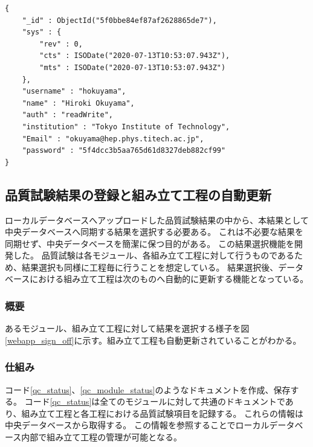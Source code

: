 \begin{lstlisting}[basicstyle=\scriptsize,caption=ウェブアプリケーションで扱うユーザ情報を持つドキュメントの例。リスト\ref{user_doc_1}で示したものとは別に、ウェブアプリケーション内でユーザ情報を扱うためにこのドキュメントを保持する必要がある。ウェブにおいてログインはこのドキュメントの存在確認をもってなされる。パスワードはhash化して保存している。,label=user_doc_2]
{
	"_id" : ObjectId("5f0bbe84ef87af2628865de7"),
	"sys" : {
		"rev" : 0,
		"cts" : ISODate("2020-07-13T10:53:07.943Z"),
		"mts" : ISODate("2020-07-13T10:53:07.943Z")
	},
	"username" : "hokuyama",
	"name" : "Hiroki Okuyama",
	"auth" : "readWrite",
	"institution" : "Tokyo Institute of Technology",
	"Email" : "okuyama@hep.phys.titech.ac.jp",
	"password" : "5f4dcc3b5aa765d61d8327deb882cf99"
}
\end{lstlisting}

\clearpage
\newpage
\subsection{品質試験結果の登録と組み立て工程の自動更新}
ローカルデータベースへアップロードした品質試験結果の中から、本結果として中央データベースへ同期する結果を選択する必要ある。
これは不必要な結果を同期せず、中央データベースを簡潔に保つ目的がある。
この結果選択機能を開発した。
品質試験は各モジュール、各組み立て工程に対して行うものであるため、結果選択も同様に工程毎に行うことを想定している。
結果選択後、データベースにおける組み立て工程は次のものへ自動的に更新する機能となっている。

\subsubsection{概要}
あるモジュール、組み立て工程に対して結果を選択する様子を図\ref{webapp_sign_off}に示す。組み立て工程も自動更新されていることがわかる。

\subsubsection{仕組み}
コード\ref{qc_status}、\ref{qc_module_status}のようなドキュメントを作成、保存する。
コード\ref{qc_status}は全てのモジュールに対して共通のドキュメントであり、組み立て工程と各工程における品質試験項目を記録する。
これらの情報は中央データベースから取得する。
この情報を参照することでローカルデータベース内部で組み立て工程の管理が可能となる。

